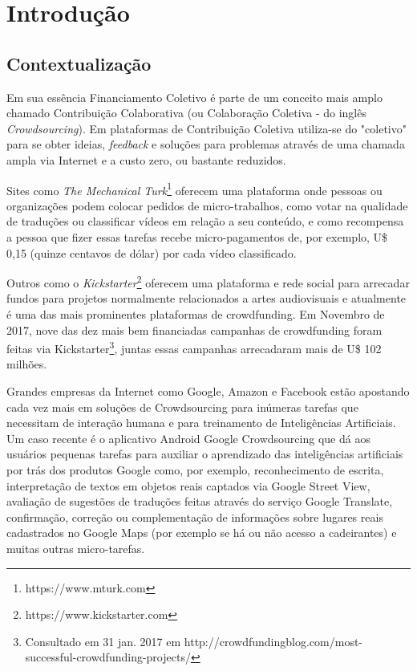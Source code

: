 \chapter{Introdução}

\section{Contextualização}
Em sua essência Financiamento Coletivo é parte de um conceito mais amplo chamado Contribuição Colaborativa (ou Colaboração Coletiva - do inglês \emph{Crowdsourcing}). Em plataformas de Contribuição Coletiva utiliza-se do "coletivo" para se obter ideias, \emph{feedback} e soluções para problemas através de uma chamada ampla via Internet e a custo zero, ou bastante reduzidos.

Sites como \emph{The Mechanical Turk}\footnote{https://www.mturk.com} oferecem uma plataforma onde pessoas ou organizações podem colocar pedidos de micro-trabalhos, como votar na qualidade de traduções ou classificar vídeos em relação a seu conteúdo, e como recompensa a pessoa que fizer essas tarefas recebe micro-pagamentos de, por exemplo, U\$ 0,15 (quinze centavos de dólar) por cada vídeo classificado.

Outros como o \emph{Kickstarter}\footnote{https://www.kickstarter.com} oferecem uma plataforma e rede social para arrecadar fundos para projetos normalmente relacionados a artes audiovisuais e atualmente é uma das mais prominentes plataformas de crowdfunding. Em Novembro de 2017, nove das dez mais bem financiadas campanhas de crowdfunding foram feitas via Kickstarter\footnote{Consultado em 31 jan. 2017 em http://crowdfundingblog.com/most-successful-crowdfunding-projects/}, juntas essas campanhas arrecadaram mais de U\$ 102 milhões.

Grandes empresas da Internet como Google, Amazon e Facebook estão apostando cada vez mais em soluções de Crowdsourcing para inúmeras tarefas que necessitam de interação humana e para treinamento de Inteligências Artificiais. Um caso recente é o aplicativo Android Google Crowdsourcing \cite{cnet-google-crowdsourcing} que dá aos usuários pequenas tarefas para auxiliar o aprendizado das inteligências artificiais por trás dos produtos Google como, por exemplo, reconhecimento de escrita, interpretação de textos em objetos reais captados via Google Street View, avaliação de sugestões de traduções feitas através do serviço Google Translate, confirmação, correção ou complementação de informações sobre lugares reais cadastrados no Google Maps (por exemplo se há ou não acesso a cadeirantes) e muitas outras micro-tarefas.

